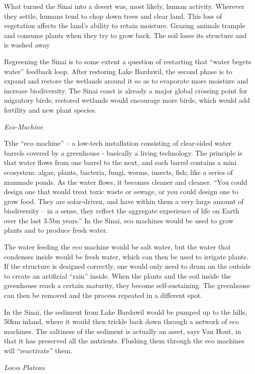 \documentclass[
]{book}
\begin{document}
What turned the Sinai into a desert was, most likely, human activity. Wherever they settle, humans tend to chop down trees and clear land. This loss of vegetation affects the land's ability to retain moisture. Grazing animals trample and consume plants when they try to grow back. The soil loses its structure and is washed away

Regreening the Sinai is to some extent a question of restarting that ``water begets water'' feedback loop. After restoring Lake Bardawil, the second phase is to expand and restore the wetlands around it so as to evaporate more moisture and increase biodiversity. The Sinai coast is already a major global crossing point for migratory birds; restored wetlands would encourage more birds, which would add fertility and new plant species.

\emph{Eco-Machine}

Tthe ``eco machine'' -- a low-tech installation consisting of
clear-sided water barrels covered by a greenhouse
- basically a living technology.
The principle is that water flows from one barrel to the next, and each barrel contains a mini ecosystem: algae, plants, bacteria, fungi, worms, insects, fish; like a series of manmade ponds. As the water flows, it becomes cleaner and cleaner. ``You could design one that would treat toxic waste or sewage, or you could design one to grow food. They are solar-driven, and have within them a very large amount of biodiversity -- in a sense, they reflect the aggregate experience of life on Earth over the last 3.5bn years.'' In the Sinai, eco machines would be used to grow plants and to produce fresh water.

The water feeding the eco machine would be salt water, but the water that condenses inside would be fresh water, which can then be used to irrigate plants. If the structure is designed correctly, one would only need to drum on the outside to create an artificial ``rain'' inside. When the plants and the soil inside the greenhouse reach a certain maturity, they become self-sustaining. The greenhouse can then be removed and the process repeated in a different spot.

In the Sinai, the sediment from Lake Bardawil would be pumped up to the hills, 50km inland, where it would then trickle back down through a network of eco machines. The saltiness of the sediment is actually an asset, says Van Hout, in that it has preserved all the nutrients. Flushing them through the eco machines will ``reactivate'' them.

\emph{Loess Plateau}
\end{document}
